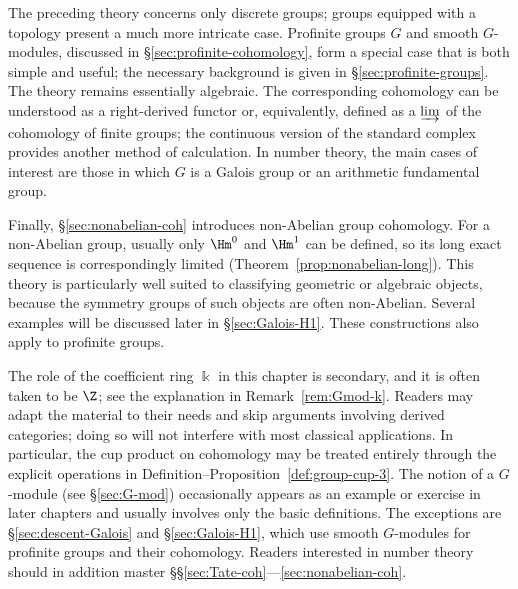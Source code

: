 The preceding theory concerns only discrete groups; groups equipped with a
topology present a much more intricate case. Profinite groups $G$ and smooth
$G$-modules, discussed in \S\ref{sec:profinite-cohomology}, form a special case
that is both simple and useful; the necessary background is given in
\S\ref{sec:profinite-groups}. The theory remains essentially algebraic. The
corresponding cohomology can be understood as a right-derived functor or,
equivalently, defined as a $\varinjlim$ of the cohomology of finite groups; the
continuous version of the standard complex provides another method of
calculation. In number theory, the main cases of interest are those in which
$G$ is a Galois group or an arithmetic fundamental group.

Finally, \S\ref{sec:nonabelian-coh} introduces non-Abelian group cohomology.
For a non-Abelian group, usually only $\Hm^0$ and $\Hm^1$ can be defined, so
its long exact sequence is correspondingly limited
(Theorem~\ref{prop:nonabelian-long}). This theory is particularly well suited
to classifying geometric or algebraic objects, because the symmetry groups of
such objects are often non-Abelian. Several examples will be discussed later
in \S\ref{sec:Galois-H1}. These constructions also apply to profinite groups.

\begin{petunjukbacaan}
	The role of the coefficient ring $\Bbbk$ in this chapter is secondary, and
	it is often taken to be $\Z$; see the explanation in
	Remark~\ref{rem:Gmod-k}. Readers may adapt the material to their needs and
	skip arguments involving derived categories; doing so will not interfere
	with most classical applications. In particular, the cup product on
	cohomology may be treated entirely through the explicit operations in
	Definition--Proposition~\ref{def:group-cup-3}. The notion of a $G$-module
	(see \S\ref{sec:G-mod}) occasionally appears as an example or exercise in
	later chapters and usually involves only the basic definitions. The
	exceptions are \S\ref{sec:descent-Galois} and \S\ref{sec:Galois-H1}, which
	use smooth $G$-modules for profinite groups and their cohomology. Readers
	interested in number theory should in addition master
	\S\S\ref{sec:Tate-coh}---\ref{sec:nonabelian-coh}.
\end{petunjukbacaan}

